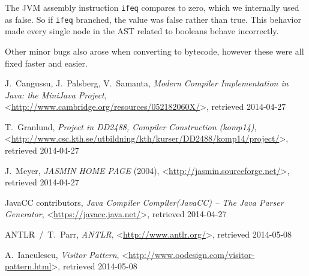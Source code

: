 \documentclass[a4paper]{article}
\begin{document}
The JVM assembly instruction \texttt{ifeq} compares to zero, which we internally
used as false. So if \texttt{ifeq} branched, the value was false rather than
true. This behavior made every single node in the AST related to booleans behave
incorrectly.

Other minor bugs also arose when converting to bytecode, however these were all
fixed faster and easier.

\begin{thebibliography}{99}

    J.~Cangussu, J.~Palsberg, V.~Samanta,
    \emph{Modern Compiler Implementation in Java: the MiniJava Project},
    <\url{http://www.cambridge.org/resources/052182060X/}>, retrieved 2014-04-27

    T.~Granlund,
    \emph{Project in DD2488, Compiler Construction (komp14)},
    <\url{http://www.csc.kth.se/utbildning/kth/kurser/DD2488/komp14/project/}>, retrieved 2014-04-27

    J.~Meyer,
    \emph{JASMIN HOME PAGE} (2004),
    <\url{http://jasmin.sourceforge.net/}>, retrieved 2014-04-27

    JavaCC contributors,
    \emph{Java Compiler Compiler\texttrademark (JavaCC\texttrademark) -- The Java Parser Generator},
    <\url{https://javacc.java.net/}>, retrieved 2014-04-27

    ANTLR~/~T.~Parr,
    \emph{ANTLR},
    <\url{http://www.antlr.org/}>, retrieved 2014-05-08

    A.~Ianculescu,
    \emph{Visitor Pattern},
    <\url{http://www.oodesign.com/visitor-pattern.html}>, retrieved 2014-05-08

\end{thebibliography}
\end{document}
